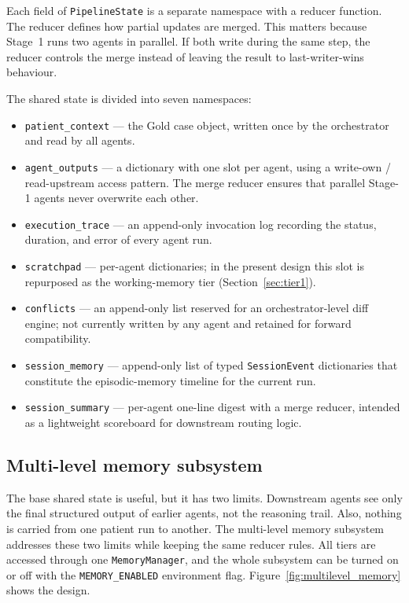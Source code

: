 Each field of \texttt{PipelineState} is a separate namespace with a reducer
function. The reducer defines how partial updates are merged. This matters
because Stage~1 runs two agents in parallel. If both write during the same
step, the reducer controls the merge instead of leaving the result to
last-writer-wins behaviour.

The shared state is divided into seven namespaces:

\begin{itemize}
  \item \texttt{patient\_context} --- the Gold case object, written once by
  the orchestrator and read by all agents.
  \item \texttt{agent\_outputs} --- a dictionary with one slot per agent,
  using a write-own / read-upstream access pattern. The merge reducer
  ensures that parallel Stage-1 agents never overwrite each other.
  \item \texttt{execution\_trace} --- an append-only invocation log
  recording the status, duration, and error of every agent run.
  \item \texttt{scratchpad} --- per-agent dictionaries; in the present
  design this slot is repurposed as the working-memory tier
  (Section~\ref{sec:tier1}).
  \item \texttt{conflicts} --- an append-only list reserved for an
  orchestrator-level diff engine; not currently written by any agent and
  retained for forward compatibility.
  \item \texttt{session\_memory} --- append-only list of typed
  \texttt{SessionEvent} dictionaries that constitute the episodic-memory
  timeline for the current run.
  \item \texttt{session\_summary} --- per-agent one-line digest with a
  merge reducer, intended as a lightweight scoreboard for downstream
  routing logic.
\end{itemize}

\subsection{Multi-level memory subsystem}
\label{sec:multilevel_memory}

The base shared state is useful, but it has two limits. Downstream agents see
only the final structured output of earlier agents, not the reasoning trail.
Also, nothing is carried from one patient run to another. The multi-level
memory subsystem addresses these two limits while keeping the same reducer
rules. All tiers are accessed through one \texttt{MemoryManager}, and the
whole subsystem can be turned on or off with the \texttt{MEMORY\_ENABLED}
environment flag. Figure~\ref{fig:multilevel_memory} shows the design.

